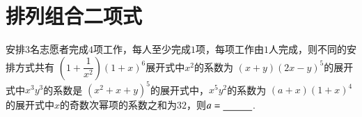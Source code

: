 \documentclass{BHCexam}
\begin{document}
\begin{questions}
\end{questions}





\section{排列组合二项式}
\begin{questions}
	\qs 安排$3$名志愿者完成$4$项工作，每人至少完成$1$项，每项工作由$1$人完成，则不同的安排方式共有\xx
	\qs $\left(1+\dfrac{1}{x^2}\right)\left(1+x\right)^6$展开式中$ x^2 $的系数为\xx
	\qs $\left(x+y\right)\left(2x-y\right)^5$的展开式中$ x^3y^3 $的系数是\xx
	\qs $ \left(x^2+x+y\right) ^5$的展开式中，$ x^5y^2 $的系数为\xx
	\qs $ \left(a+x\right)\left(1+x\right)^4 $的展开式中$ x $的奇数次幂项的系数之和为$32$，则$ a=\underline{\hspace{3em}} $.
\end{questions}
\end{document}

